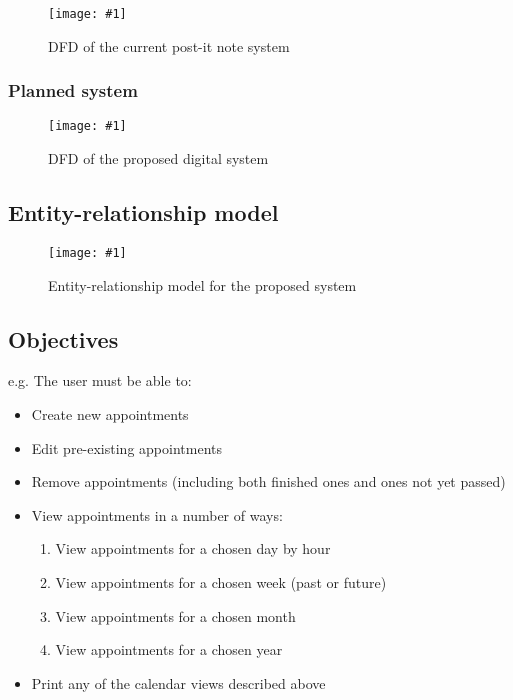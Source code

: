 \newcommand{\addfigure}[3]{
    \begin{figure}[H]
        \centering
        \texttt{[image: \#1]}
        \caption{#2}
        \label{#3}
    \end{figure}
}

\addfigure
    {dfd-orig}
    {DFD of the current post-it note system}
    {fig:dfd-orig}

\subsubsection{Planned system}

\addfigure
    {dfd-new}
    {DFD of the proposed digital system}
    {fig:dfd-new}


\subsection{Entity-relationship model}

\addfigure
    {er-model-new}
    {Entity-relationship model for the proposed system}
    {fig:er-model-new}


\subsection{Objectives}


e.g. The user must be able to:

\begin{itemize}
  \item Create new appointments
  \item Edit pre-existing appointments
  \item Remove appointments (including both finished ones and ones not yet passed)
  \item View appointments in a number of ways:
  \begin{enumerate}
      \item View appointments for a chosen day by hour
      \item View appointments for a chosen week (past or future)
      \item View appointments for a chosen month
      \item View appointments for a chosen year
  \end{enumerate}
  \item Print any of the calendar views described above
\end{itemize}

